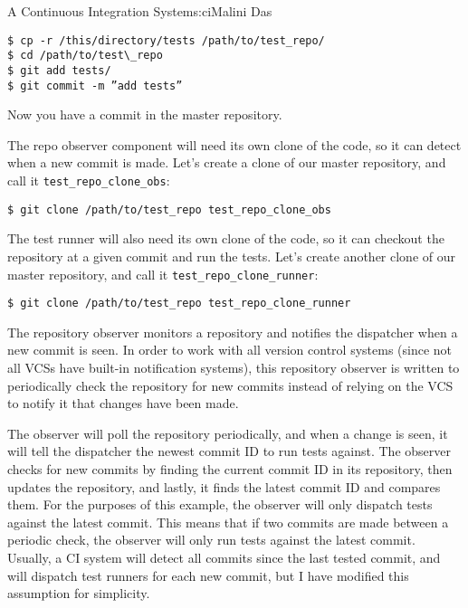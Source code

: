 \begin{aosachapter}{A Continuous Integration System}{s:ci}{Malini Das}
\begin{verbatim}
$ cp -r /this/directory/tests /path/to/test_repo/ 
$ cd /path/to/test\_repo 
$ git add tests/ 
$ git commit -m ”add tests”
\end{verbatim}

Now you have a commit in the master repository.

The repo observer component will need its own clone of the code, so it
can detect when a new commit is made. Let's create a clone of our master
repository, and call it \texttt{test\_repo\_clone\_obs}:

\begin{verbatim}
$ git clone /path/to/test_repo test_repo_clone_obs
\end{verbatim}

The test runner will also need its own clone of the code, so it can
checkout the repository at a given commit and run the tests. Let's
create another clone of our master repository, and call it
\texttt{test\_repo\_clone\_runner}:

\begin{verbatim}
$ git clone /path/to/test_repo test_repo_clone_runner
\end{verbatim}

\label{the-components}

\label{the-repository-observer-repoux5fobserver.py}

The repository observer monitors a repository and notifies the
dispatcher when a new commit is seen. In order to work with all version
control systems (since not all VCSs have built-in notification systems),
this repository observer is written to periodically check the repository
for new commits instead of relying on the VCS to notify it that changes
have been made.

The observer will poll the repository periodically, and when a change is
seen, it will tell the dispatcher the newest commit ID to run tests
against. The observer checks for new commits by finding the current
commit ID in its repository, then updates the repository, and lastly, it
finds the latest commit ID and compares them. For the purposes of this
example, the observer will only dispatch tests against the latest
commit. This means that if two commits are made between a periodic
check, the observer will only run tests against the latest commit.
Usually, a CI system will detect all commits since the last tested
commit, and will dispatch test runners for each new commit, but I have
modified this assumption for simplicity.


\end{aosachapter}
